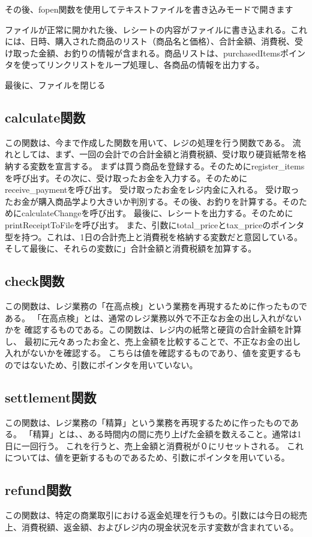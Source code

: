 \documentclass[a4j,11pt]{jarticle}
\begin{document}
その後、fopen関数を使用してテキストファイルを書き込みモードで開きます

ファイルが正常に開かれた後、レシートの内容がファイルに書き込まれる。これには、日時、購入された商品のリスト（商品名と価格）、合計金額、消費税、受け取った金額、お釣りの情報が含まれる。商品リストは、purchasedItemsポインタを使ってリンクリストをループ処理し、各商品の情報を出力する。

最後に、ファイルを閉じる
\subsection{calculate関数}
この関数は、今まで作成した関数を用いて、レジの処理を行う関数である。
流れとしては、まず、一回の会計での合計金額と消費税額、受け取り硬貨紙幣を格納する変数を宣言する。
まずは買う商品を登録する。そのためにregister\_itemsを呼び出す。その次に、受け取ったお金を入力する。そのためにreceive\_paymentを呼び出す。
受け取ったお金をレジ内金に入れる。
受け取ったお金が購入商品学より大きいか判別する。その後、お釣りを計算する。そのためにcalculateChangeを呼び出す。
最後に、レシートを出力する。そのためにprintReceiptToFileを呼び出す。
また、引数にtotal\_priceとtax\_priceのポインタ型を持つ。これは、1日の合計売上と消費税を格納する変数だと意図している。そして最後に、それらの変数に」合計金額と消費税額を加算する。
\subsection{check関数}
この関数は、レジ業務の「在高点検」という業務を再現するために作ったものである。
「在高点検」とは、通常のレジ業務以外で不正なお金の出し入れがないかを
確認するものである。この関数は、レジ内の紙幣と硬貨の合計金額を計算し、
最初に元々あったお金と、売上金額を比較することで、不正なお金の出し入れがないかを確認する。
こちらは値を確認するものであり、値を変更するものではないため、引数にポインタを用いていない。
\subsection{settlement関数}
この関数は、レジ業務の「精算」という業務を再現するために作ったものである。
「精算」とは、、ある時間内の間に売り上げた金額を数えること。通常は1日に一回行う。
これを行うと、売上金額と消費税が０にリセットされる。
これについては、値を更新するものであるため、引数にポインタを用いている。
\subsection{refund関数}
この関数は、特定の商業取引における返金処理を行うもの。引数には今日の総売上、消費税額、返金額、およびレジ内の現金状況を示す変数が含まれている。
\end{document}
